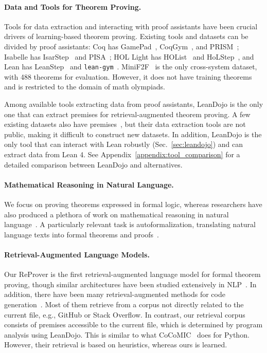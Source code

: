 \documentclass{article}
\newcommand{\smallsec}[1]{\vspace{-1mm} \paragraph{#1.}}
\newcommand\name{ReProver}
\begin{document}
\smallsec{Data and Tools for Theorem Proving}
Tools for data extraction and interacting with proof assistants have been crucial drivers of learning-based theorem proving. Existing tools and datasets can be divided by proof assistants: Coq has GamePad~\cite{huanggamepad}, CoqGym~\cite{yang2019learning}, and PRISM~\cite{reichel2023proof}; Isabelle has IsarStep~\cite{li2021isarstep} and PISA~\cite{jiang2021lisa}; HOL Light has HOList~\cite{bansal2019holist} and HoLStep~\cite{kaliszykholstep}, and Lean has LeanStep~\cite{han2022proof} and \texttt{lean-gym}~\cite{polu2023formal}. MiniF2F~\cite{zheng2022minif2f} is the only cross-system dataset, with 488 theorems for evaluation. However, it does not have training theorems and is restricted to the domain of math olympiads. 
 
Among available tools extracting data from proof assistants, LeanDojo is the only one that can extract premises for retrieval-augmented theorem proving. A few existing datasets also have premises~\cite{bansal2019holist,mikula2023magnushammer}, but their data extraction tools are not public, making it difficult to construct new datasets. In addition, LeanDojo is the only tool that can interact with Lean robustly (Sec.~\ref{sec:leandojo}) and can extract data from Lean 4. See Appendix~\ref{appendix:tool_comparison} for a detailed comparison between LeanDojo and alternatives.


\smallsec{Mathematical Reasoning in Natural Language}
We focus on proving theorems expressed in formal logic, whereas researchers have also produced a plethora of work on mathematical reasoning in natural language~\cite{hendrycks2021measuring,lewkowycz2022solving,ferreira2020premise,welleck2021naturalproofs,welleck2022naturalprover,mishra2022lila,lu2022survey,meadows2022survey}. A particularly relevant task is autoformalization, translating natural language texts into formal theorems and proofs~\cite{wang2018first,cosler2023nl2spec,pan2023data,hahn2022formal,wu2022autoformalization,jiang2023draft,zhao2023decomposing,cunningham2023towards,azerbayev2023proofnet,chen2023nl2tl}. 

\smallsec{Retrieval-Augmented Language Models}
Our {\name} is the first retrieval-augmented language model for formal theorem proving, though similar architectures have been studied extensively in NLP~\cite{khandelwal2020generalization,guu2020retrieval,lewis2020retrieval,borgeaud2022improving,li2022decoupled,jiang2022retrieval,wu2022memorizing,izacard2022few,zhong2022training}. In addition, there have been many retrieval-augmented methods for code generation~\cite{hayati2018retrieval,parvez2021retrieval,lu2022reacc,zhou2023docprompting,shrivastava2022repository,zhang2023repocoder,ding2022cocomic}. Most of them retrieve from a corpus not directly related to the current file, e.g., GitHub or Stack Overflow. In contrast, our retrieval corpus consists of premises accessible to the current file, which is determined by program analysis using LeanDojo. This is similar to what CoCoMIC~\cite{ding2022cocomic} does for Python. However, their retrieval is based on heuristics, whereas ours is learned. 
\end{document}
